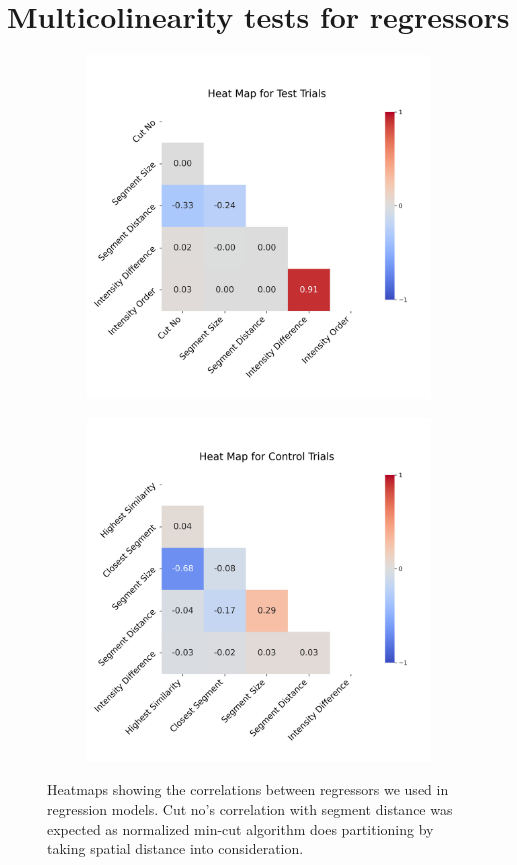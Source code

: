 \documentclass{article}
\begin{document}
\section{Multicolinearity tests for regressors}
\label{multicol}
\begin{figure}[!ht]
    \centering
    \begin{subfigure}{\textwidth}
        \centering
        \includegraphics[width = 0.72\linewidth]{Thesis/plots/heatMap_test.png}
        \label{fig:heatmap_test}
    \end{subfigure}
    \hfill
    \vspace*{-1.4cm}
    \begin{subfigure}{\textwidth}
        \centering
        \includegraphics[width = 0.72\linewidth]{Thesis/plots/heatMap_cntrl.png}
        \label{fig:heatmap_control}
    \end{subfigure}
    \label{fig:heatmap}
    \vspace*{-1.7cm}
    \caption{Heatmaps showing the correlations between regressors we used in regression models. Cut no's correlation with segment distance was expected as normalized min-cut algorithm does partitioning by taking spatial distance into consideration.}
\end{figure}
\clearpage
\end{document}
